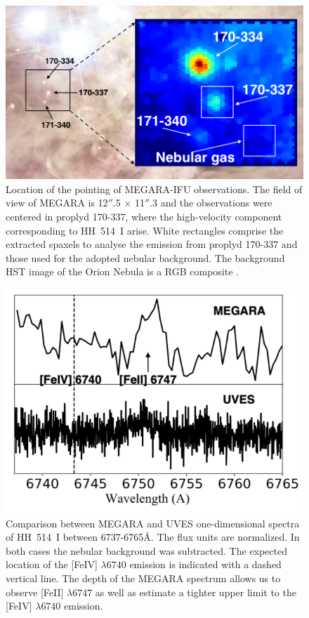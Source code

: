 \documentclass[fleqn,usenatbib]{mnras}
\begin{document}
\begin{figure}
\includegraphics[width=\columnwidth]{MEGARA_IFU.png}
\caption{ Location of the pointing of MEGARA-IFU observations. The field of view of MEGARA is 12$''$.5 $\times$ 11$''$.3 and the observations were centered in proplyd 170-337, where the high-velocity component corresponding to HH~514~I arise. White rectangles comprise the extracted spaxels to analyse the emission from proplyd 170-337 and those used for the adopted nebular background. The background HST image of the Orion Nebula is a RGB composite  \citep[Red: ACS F658N+F775W+F850LP; Green: ACS F555W; Blue: ACS F435W,][]{Robberto:2013a}.}
\label{fig:megara}
\end{figure}



\begin{figure}
\includegraphics[width=\columnwidth]{megara_UVES.png}
\caption{Comparison between MEGARA and UVES one-dimensional spectra of HH~514~I between 6737-6765\AA. The flux units are normalized. In both cases the nebular background was subtracted. The expected location of the [Fe\thinspace IV] $\lambda 6740$ emission is indicated with a dashed vertical line. The depth of the MEGARA spectrum allows us to observe [Fe\thinspace II] $\lambda 6747$ as well as estimate a tighter upper limit to the [Fe\thinspace IV] $\lambda 6740$  emission.  }
\label{fig:megara_vs_UVES}
\end{figure}
\end{document}
